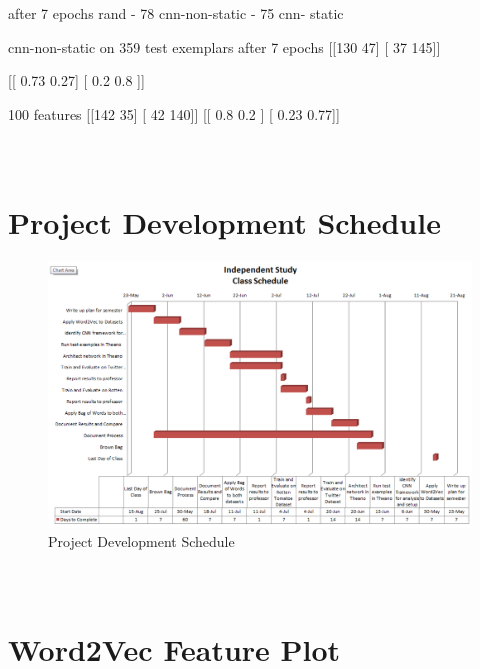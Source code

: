\documentclass[12pt]{article}
\begin{document}
after 7 epochs
rand - 78 %
cnn-non-static - 75 %
cnn- static

cnn-non-static on 359 test exemplars after 7 epochs
[[130  47]
[ 37 145]]

[[ 0.73  0.27]
[ 0.2   0.8 ]]

100 features
[[142  35]
[ 42 140]]
[[ 0.8   0.2 ]
[ 0.23  0.77]]


\newpage
\appendix
\section{\\Project Development Schedule} \label{App:AppendixA}
\begin{figure}[htbp!]
	\centering
	\includegraphics[scale=.5]{gantt.PNG}
	\caption{Project Development Schedule}
\end{figure}

\newpage
\section{\\Word2Vec Feature Plot} \label{App:AppendixB}
\end{document}
